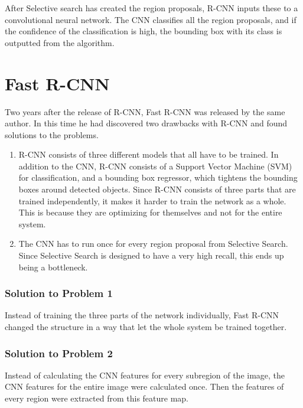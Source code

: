 After Selective search has created the region proposals, R-CNN inputs these to a convolutional neural network. The CNN classifies all the region proposals, and if the confidence of the classification is high, the bounding box with its class is outputted from the algorithm. 


\newpage

\section{Fast R-CNN}

Two years after the release of R-CNN, Fast R-CNN  \citep{FastR-CNN} was released by the same author. In this time he had discovered two drawbacks with R-CNN and found solutions to the problems. 

\begin{enumerate}
    \item R-CNN consists of three different models that all have to be trained. In addition to the CNN, R-CNN consists of a Support Vector Machine (SVM) for classification, and a bounding box regressor, which tightens the bounding boxes around detected objects. Since R-CNN consists of three parts that are trained independently, it makes it harder to train the network as a whole. This is because they are optimizing for themselves and not for the entire system. 
    \item The CNN has to run once for every region proposal from Selective Search. Since Selective Search is designed to have a very high recall, this ends up being a bottleneck. 
\end{enumerate}

\subsubsection{Solution to Problem 1}
Instead of training the three parts of the network individually, Fast R-CNN changed the structure in a way that let the whole system be trained together.

\subsubsection{Solution to Problem 2}
Instead of calculating the CNN features for every subregion of the image, the CNN features for the entire image were calculated once. Then the features of every region were extracted from this feature map.



